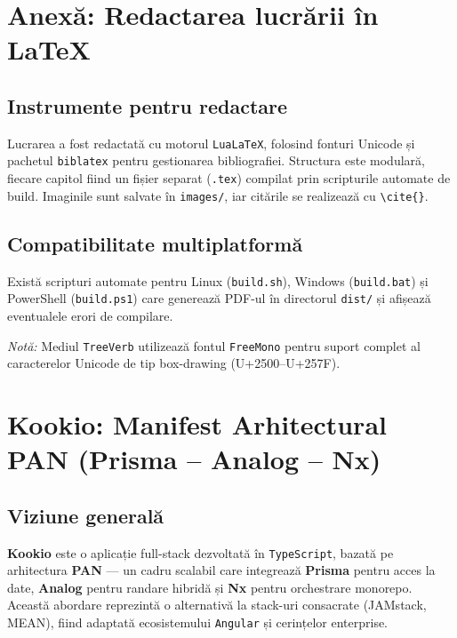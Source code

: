 \chapter{Anexă: Redactarea lucrării în \LaTeX}\label{ch:appendix-latex}

\section{Instrumente pentru redactare}
Lucrarea a fost redactată cu motorul \texttt{LuaLaTeX}, folosind fonturi Unicode și pachetul
\texttt{biblatex} pentru gestionarea bibliografiei. Structura este modulară, fiecare capitol
fiind un fișier separat (\texttt{.tex}) compilat prin scripturile automate de build.
Imaginile sunt salvate în \texttt{images/}, iar citările se realizează cu \verb|\cite{}|.

\section{Compatibilitate multiplatformă}
Există scripturi automate pentru Linux (\texttt{build.sh}), Windows (\texttt{build.bat})
și PowerShell (\texttt{build.ps1}) care generează PDF-ul în directorul \texttt{dist/}
și afișează eventualele erori de compilare.

\vspace{0.5em}
\noindent\textit{Notă:} Mediul \texttt{TreeVerb} utilizează fontul \texttt{FreeMono} pentru suport complet al caracterelor Unicode de tip box-drawing (U+2500–U+257F).

\nocite{vite,cockroachdb,redis,firebase_auth,json_schema}


\chapter{Kookio: Manifest Arhitectural PAN (Prisma – Analog – Nx)}\label{ch:appendix-manifest}

\section{Viziune generală}
\textbf{Kookio} este o aplicație full-stack dezvoltată în \texttt{TypeScript}, bazată pe arhitectura
\textbf{PAN} — un cadru scalabil care integrează \textbf{Prisma} pentru acces la date,
\textbf{Analog} pentru randare hibridă și \textbf{Nx} pentru orchestrare monorepo.
Această abordare reprezintă o alternativă la stack-uri consacrate (JAMstack, MEAN),
fiind adaptată ecosistemului \texttt{Angular} și cerințelor enterprise.

